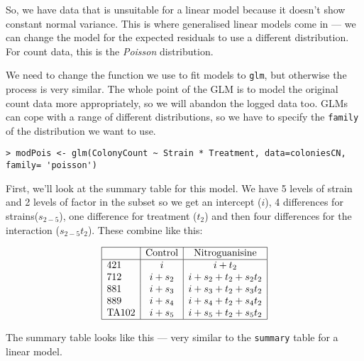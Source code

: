 So, we have data that is unsuitable for a linear model because it 
doesn't show constant normal variance. This is where generalised linear 
models come in --- we can change the model for the expected residuals 
to use a different distribution. For count data, this is the {\it 
Poisson} distribution.

We need to change the function we use to fit models to {\tt glm}, but 
otherwise the process is very similar. The whole point of the GLM is to 
model the original count data more appropriately, so we will abandon 
the logged data too. GLMs can cope with a range of different 
distributions, so we have to specify the {\tt family} of the 
distribution we want to use.

\begin{lstlisting}
> modPois <- glm(ColonyCount ~ Strain * Treatment, data=coloniesCN, 
family= 'poisson')
\end{lstlisting}

First, we'll look at the summary table for this model. We have 5 levels 
of strain and 2 levels of factor in the subset so we get an intercept 
($i$), 4 differences for strains($s_{2-5}$), one difference for 
treatment ($t_2$) and then four differences for the interaction 
($s_{2-5}t_2$). These combine like this:
 
\[\begin{array}{|l|c|c|}
\hline
							& \textrm{Control} & \textrm{Nitroguanisine} \\
\hline
\textrm{421}   & i        & i+t_2              \\
\textrm{712}   & i + s_2  & i+s_2+t_2+ s_2t_2  \\
\textrm{881}   & i + s_3  & i+s_3+t_2 + s_3t_2  \\
\textrm{889}   & i + s_4  & i+s_4+t_2 + s_4t_2  \\
\textrm{TA102} & i + s_5  & i+s_5+t_2  + s_5t_2 \\
\hline
\end{array}\]

The summary table looks like this --- very similar to the {\tt summary} 
table for a linear model.

